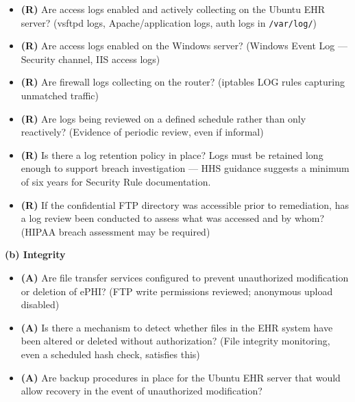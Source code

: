 \documentclass[12pt]{article}
\newcommand{\hipbadge}[2]{%
  \colorbox{#1}{\color{white}\textbf{\small #2}}%
}
\newcommand{\cbox}{\ding{113}\;}
\begin{document}
\begin{checklistbox}
\begin{itemize}[leftmargin=1.5em, label=\cbox, itemsep=4pt]
  \item \textbf{(R)} Are access logs enabled and actively collecting on the
    Ubuntu EHR server? (vsftpd logs, Apache/application logs, auth logs in
    \texttt{/var/log/})
  \item \textbf{(R)} Are access logs enabled on the Windows server?
    (Windows Event Log --- Security channel, IIS access logs)
  \item \textbf{(R)} Are firewall logs collecting on the router?
    (iptables LOG rules capturing unmatched traffic)
  \item \textbf{(R)} Are logs being reviewed on a defined schedule rather
    than only reactively? (Evidence of periodic review, even if informal)
  \item \textbf{(R)} Is there a log retention policy in place? Logs must be
    retained long enough to support breach investigation --- HHS guidance
    suggests a minimum of six years for Security Rule documentation.
  \item \textbf{(R)} If the confidential FTP directory was accessible prior
    to remediation, has a log review been conducted to assess what was
    accessed and by whom? (HIPAA breach assessment may be required)
\end{itemize}
\end{checklistbox}
 
\bigskip
 
\noindent\hipbadge{integcol}{(b) Integrity}
 
\begin{checklistbox}
\begin{itemize}[leftmargin=1.5em, label=\cbox, itemsep=4pt]
  \item \textbf{(A)} Are file transfer services configured to prevent
    unauthorized modification or deletion of ePHI? (FTP write permissions
    reviewed; anonymous upload disabled)
  \item \textbf{(A)} Is there a mechanism to detect whether files in the
    EHR system have been altered or deleted without authorization?
    (File integrity monitoring, even a scheduled hash check, satisfies this)
  \item \textbf{(A)} Are backup procedures in place for the Ubuntu EHR
    server that would allow recovery in the event of unauthorized
    modification?
\end{itemize}
\end{checklistbox}
 
\end{document}
